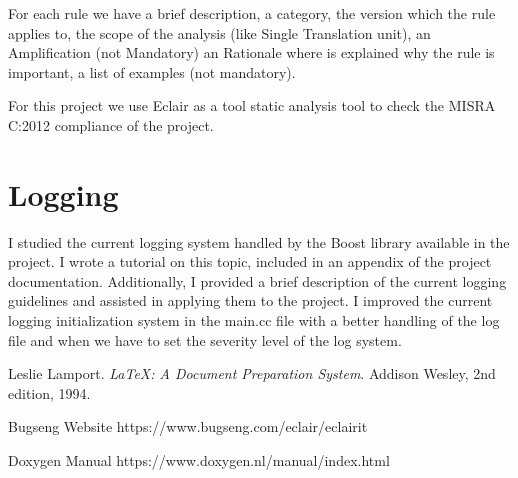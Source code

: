 \documentclass[a4paper, 12pt]{article}
\begin{document}
For each rule we have a brief description, a category, the version which the rule applies to, the scope of the analysis (like Single Translation unit), 
an Amplification (not Mandatory) an Rationale where is explained why the rule is important, a list of examples (not mandatory).

For this project we use Eclair \cite{Eclair} as a tool static analysis tool to check the MISRA C:2012 compliance of the project.

\section{Logging}

I studied the current logging system handled by the Boost library available in the project. 
I wrote a tutorial on this topic, included in an appendix of the project documentation. Additionally, I provided a brief description of the current logging guidelines and assisted in applying them to the project.
I improved the current logging initialization system in the main.cc file with a better handling of the log file and when we have to set the 
severity level of the log system.


\begin{thebibliography}{9}
    Leslie Lamport.
    \textit{LaTeX: A Document Preparation System}.
    Addison Wesley, 2nd edition, 1994.

    Bugseng Website
    https://www.bugseng.com/eclair/eclairit

    Doxygen Manual
    https://www.doxygen.nl/manual/index.html

\end{thebibliography}
\end{document}
